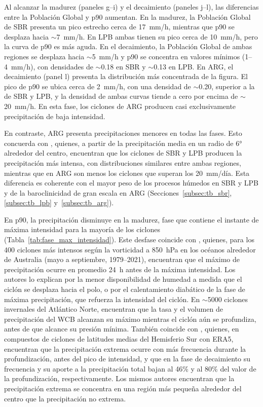 Al alcanzar la madurez (paneles g--i) y el decaimiento (paneles j--l), las diferencias entre la Población Global y p90 aumentan.
En la madurez, la Población Global de SBR presenta un pico estrecho cerca de 17~mm/h, mientras que p90 se desplaza hacia ${\sim}$7~mm/h. En LPB ambas tienen su pico cerca de 10~mm/h, pero la curva de p90 es más aguda. En el decaimiento, la Población Global de ambas regiones se desplaza hacia ${\sim}$5~mm/h y p90 se concentra en valores mínimos (1--4~mm/h), con densidades de ${\sim}$0.18 en SBR y ${\sim}$0.13 en LPB.
En ARG, el decaimiento (panel l) presenta la distribución más concentrada de la figura. El pico de p90 se ubica cerca de 2~mm/h, con una densidad de ${\sim}$0.20, superior a la de SBR y LPB, y la densidad de ambas curvas tiende a cero por encima de ${\sim}$20~mm/h. En esta fase, los ciclones de ARG producen casi exclusivamente precipitación de baja intensidad.

En contraste, ARG presenta precipitaciones menores en todas las fases. Esto concuerda con \citet{gramcianinov2019properties}, quienes, a partir de la precipitación media en un radio de 6° alrededor del centro, encuentran que los ciclones de SBR y LPB producen la precipitación más intensa, con distribuciones similares entre ambas regiones, mientras que en ARG son menos los ciclones que superan los 20~mm/día. Esta diferencia es coherente con el mayor peso de los procesos húmedos en SBR y LPB y de la baroclinicidad de gran escala en ARG (Secciones~\ref{subsec:tb_sbr}, \ref{subsec:tb_lpb} y~\ref{subsec:tb_arg}).

En p90, la precipitación disminuye en la madurez, fase que contiene el instante de máxima intensidad para la mayoría de los ciclones (Tabla~\ref{tab:fase_max_intensidad}). Este desfase coincide con \citet{dacre2023climatology}, quienes, para los 400 ciclones más intensos según la vorticidad a 850~hPa en los océanos alrededor de Australia (mayo a septiembre, 1979--2021), encuentran que el máximo de precipitación ocurre en promedio 24~h antes de la máxima intensidad. Los autores lo explican por la menor disponibilidad de humedad a medida que el ciclón se desplaza hacia el polo, o por el calentamiento diabático de la fase de máxima precipitación, que refuerza la intensidad del ciclón. En ${\sim}$5000 ciclones invernales del Atlántico Norte, \citet{heitmann2024lifecycle} encuentran que la tasa y el volumen de precipitación del WCB alcanzan su máximo mientras el ciclón aún se profundiza, antes de que alcance su presión mínima.
También coincide con \citet{mcerlich2023extremes}, quienes, en compuestos de ciclones de latitudes medias del Hemisferio Sur con ERA5, encuentran que la precipitación extrema ocurre con más frecuencia durante la profundización, antes del pico de intensidad, y que en la fase de decaimiento su frecuencia y su aporte a la precipitación total bajan al 46\% y al 80\% del valor de la profundización, respectivamente. Los mismos autores encuentran que la precipitación extrema se concentra en una región más pequeña alrededor del centro que la precipitación no extrema.

